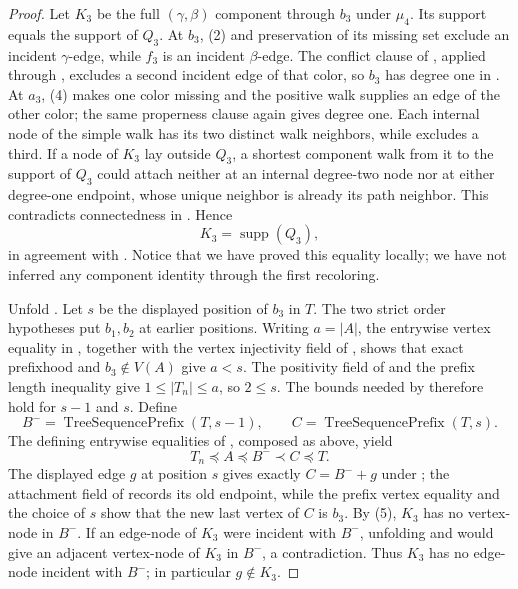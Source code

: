\begin{proof}
Let $K_3$ be the full $(\gamma,\beta)$ component through $b_3$ under
$\mu_4$.  Its support equals the support of $Q_3$.  At $b_3$, (2) and
preservation of its missing set exclude an incident $\gamma$-edge,
while $f_3$ is an incident $\beta$-edge.  The conflict clause of
, applied through ,
excludes a second incident edge of that color, so $b_3$ has degree one
in .  At $a_3$, (4) makes one color
missing and the positive walk supplies an edge of the other color; the
same properness clause again gives degree one.  Each internal node of
the simple walk has its two distinct walk neighbors, while
 excludes a third.  If a node
of $K_3$ lay outside $Q_3$, a shortest component walk from it to the
support of $Q_3$ could attach neither at an internal degree-two node nor
at either degree-one endpoint, whose unique neighbor is already its path
neighbor.  This contradicts connectedness in
.  Hence
\[
                         K_3=\operatorname{supp}(Q_3),         \tag{5}
\]
in agreement with .  Notice that
we have proved this equality locally; we have not inferred any component
identity through the first recoloring.

Unfold .  Let $s$ be the displayed position of
$b_3$ in $T$.  The two strict order hypotheses put $b_1,b_2$ at earlier
positions.  Writing $a=|A|$, the entrywise vertex equality in
, together with the vertex
injectivity field of , shows that exact
prefixhood and $b_3\notin V(A)$ give $a<s$.  The positivity field of
 and the prefix length inequality give
$1\leq|T_n|\leq a$, so $2\leq s$.  The bounds needed by
 therefore hold for $s-1$ and $s$.  Define
\[
 B^-=\operatorname{TreeSequencePrefix}(T,s-1),\qquad
 C=\operatorname{TreeSequencePrefix}(T,s).                    \tag{6}
\]
The defining entrywise equalities of
, composed as above, yield
\[
              T_n\preccurlyeq A\preccurlyeq B^-\prec C
                 \preccurlyeq T.                              \tag{7}
\]
The displayed edge $g$ at position $s$ gives exactly
$C=B^-+g$ under ; the attachment field
of  records its old endpoint, while the prefix
vertex equality and the choice of $s$ show that the new last vertex of
$C$ is $b_3$.  By (5), $K_3$ has no vertex-node in $B^-$.  If an
edge-node of $K_3$ were incident with $B^-$, unfolding
 and  would give an
adjacent vertex-node of $K_3$ in $B^-$, a contradiction.  Thus $K_3$
has no edge-node incident with $B^-$; in particular $g\notin K_3$.


\end{proof}

